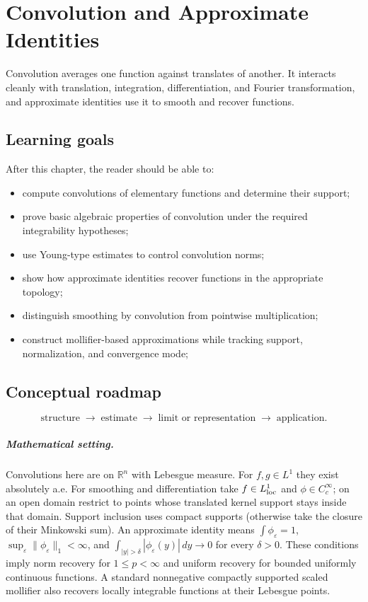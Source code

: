 \chapter{Convolution and Approximate Identities}
\label{ch:iii10}

Convolution averages one function against translates of another. It interacts cleanly with translation, integration, differentiation, and Fourier transformation, and approximate identities use it to smooth and recover functions.

\section*{Learning goals}
After this chapter, the reader should be able to:
\begin{itemize}
\item compute convolutions of elementary functions and determine their support;
\item prove basic algebraic properties of convolution under the required integrability hypotheses;
\item use Young-type estimates to control convolution norms;
\item show how approximate identities recover functions in the appropriate topology;
\item distinguish smoothing by convolution from pointwise multiplication;
\item construct mollifier-based approximations while tracking support, normalization, and convergence mode;
\end{itemize}
\section*{Conceptual roadmap}
\[
\boxed{\text{structure}\;\longrightarrow\;\text{estimate}\;\longrightarrow\;\text{limit or representation}\;\longrightarrow\;\text{application}.}
\]

\paragraph{Mathematical setting.}
Convolutions here are on $\mathbb R^n$ with Lebesgue measure. For $f,g\in L^1$ they exist absolutely a.e. For smoothing and differentiation take $f\in L^1_{\rm loc}$ and $\phi\in C_c^\infty$; on an open domain restrict to points whose translated kernel support stays inside that domain. Support inclusion uses compact supports (otherwise take the closure of their Minkowski sum). An approximate identity means $\int\phi_\varepsilon=1$, $\sup_\varepsilon\|\phi_\varepsilon\|_1<\infty$, and $\int_{|y|>\delta}|\phi_\varepsilon(y)|\,dy\to0$ for every $\delta>0$. These conditions imply norm recovery for $1\le p<\infty$ and uniform recovery for bounded uniformly continuous functions. A standard nonnegative compactly supported scaled mollifier also recovers locally integrable functions at their Lebesgue points.

